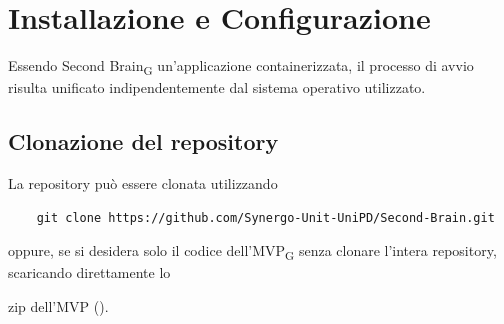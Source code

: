 \section{Installazione e Configurazione}
Essendo Second Brain\textsubscript{G} un'applicazione containerizzata, il processo di avvio risulta unificato indipendentemente dal sistema operativo utilizzato.

\subsection{Clonazione del repository}
La repository può essere clonata utilizzando 
\begin{verbatim}
    git clone https://github.com/Synergo-Unit-UniPD/Second-Brain.git
\end{verbatim}
oppure, se si desidera solo il codice dell'MVP\textsubscript{G} senza clonare l'intera repository, scaricando direttamente lo

zip dell'MVP ().

